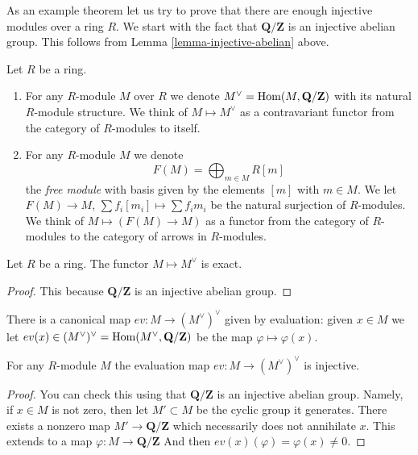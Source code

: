 \noindent
As an example theorem let us try to prove that there are enough injective
modules over a ring $R$. We start with the fact that $\mathbf{Q}/\mathbf{Z}$
is an injective abelian group. This follows from
Lemma \ref{lemma-injective-abelian} above.

\begin{definition}
\label{definition-simple-functors}
Let $R$ be a ring.
\begin{enumerate}
\item For any $R$-module $M$ over $R$ we denote
$M^\vee = \mathop{\rm Hom}\nolimits(M, \mathbf{Q}/\mathbf{Z})$
with its natural $R$-module structure. We think
of {\it $M \mapsto M^\vee$} as a contravariant functor
from the category of $R$-modules to itself.
\item For any $R$-module $M$ we denote
$$
F(M) = \bigoplus\nolimits_{m \in M} R[m]
$$
the {\it free module} with basis given by the elements $[m]$ with
$m \in M$. We let $F(M)\to M$, $\sum f_i [m_i] \mapsto \sum f_i m_i$
be the natural surjection of $R$-modules.
We think of $M \mapsto (F(M) \to M)$ as a functor from
the category of $R$-modules to the category of
arrows in $R$-modules.
\end{enumerate}
\end{definition}

\begin{lemma}
\label{lemma-vee-exact}
Let $R$ be a ring.
The functor $M \mapsto M^\vee$ is exact.
\end{lemma}

\begin{proof}
This because $\mathbf{Q}/\mathbf{Z}$
is an injective abelian group.
\end{proof}

\noindent
There is a canonical map $ev : M \to (M^\vee)^\vee$
given by evaluation: given $x \in M$ we let
$ev(x) \in (M^\vee)^\vee = \mathop{\rm Hom}\nolimits(M^\vee, \mathbf{Q}/\mathbf{Z})$
be the map $\varphi \mapsto \varphi(x)$.

\begin{lemma}
\label{lemma-ev-injective}
For any $R$-module $M$ the evaluation map
$ev : M \to (M^\vee)^\vee$ is injective.
\end{lemma}

\begin{proof}
You can check this using that $\mathbf{Q}/\mathbf{Z}$ is an injective
abelian group. Namely, if $x \in M$ is not zero, then let
$M' \subset M$ be the cyclic group it generates. There exists
a nonzero map $M' \to \mathbf{Q}/\mathbf{Z}$ which necessarily does
not annihilate $x$. This extends to
a map $\varphi : M \to \mathbf{Q}/\mathbf{Z}$
And then $ev(x)(\varphi) = \varphi(x) \not = 0$.
\end{proof}

